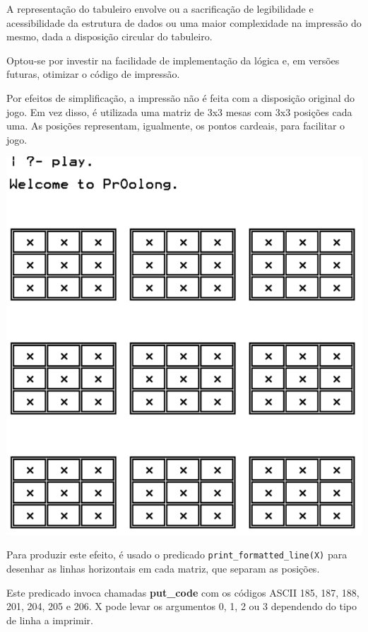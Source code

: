 \documentclass[a4paper]{article}
\begin{document}
A representação do tabuleiro envolve ou a sacrificação de legibilidade e acessibilidade da estrutura de dados ou uma maior complexidade na impressão do mesmo, dada a disposição circular do tabuleiro.

Optou-se por investir na facilidade de implementação da lógica e, em versões futuras, otimizar o código de impressão.

Por efeitos de simplificação, a impressão não é feita com a disposição original do jogo. Em vez disso, é utilizada uma matriz de 3x3 mesas com 3x3 posições cada uma. As posições representam, igualmente, os pontos cardeais, para facilitar o jogo.

\begin{center}
\includegraphics[scale=0.33]{tabuleiro.png}
\end{center}

Para produzir este efeito, é usado o predicado \texttt{print\_formatted\_line(X)} para desenhar as linhas horizontais em cada matriz, que separam as posições. 

Este predicado invoca chamadas \textbf{put\_code} com os códigos ASCII 185, 187, 188, 201, 204, 205 e 206. X pode levar os argumentos 0, 1, 2 ou 3 dependendo do tipo de linha a imprimir. \newline
\end{document}
